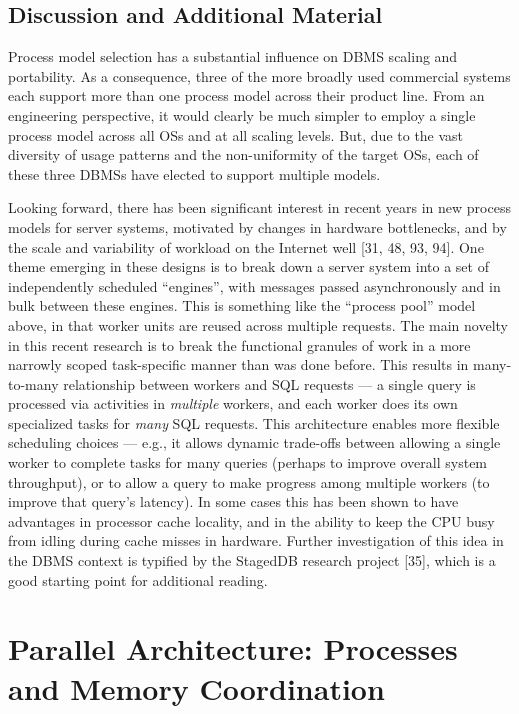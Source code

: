\documentclass[b5paper,11pt,twoside,openright]{book}
\begin{document}
\hypertarget{discussion-and-additional-material}{%
\section{Discussion and Additional
Material}\label{discussion-and-additional-material}}

Process model selection has a substantial influence on DBMS scaling and
portability. As a consequence, three of the more broadly used commercial
systems each support more than one process model across their product
line. From an engineering perspective, it would clearly be much simpler
to employ a single process model across all OSs and at all scaling
levels. But, due to the vast diversity of usage patterns and the
non-uniformity of the target OSs, each of these three DBMSs have elected
to support multiple models.

Looking forward, there has been significant interest in recent years in
new process models for server systems, motivated by changes in hardware
bottlenecks, and by the scale and variability of workload on the
Internet well {[}31, 48, 93, 94{]}. One theme emerging in these designs
is to break down a server system into a set of independently scheduled
``engines'', with messages passed asynchronously and in bulk between
these engines. This is something like the ``process pool'' model above,
in that worker units are reused across multiple requests. The main
novelty in this recent research is to break the functional granules of
work in a more narrowly scoped task-specific manner than was done
before. This results in many-to-many relationship between workers and
SQL requests --- a single query is processed via activities in
\emph{multiple} workers, and each worker does its own specialized tasks
for \emph{many} SQL requests. This architecture enables more flexible
scheduling choices --- e.g., it allows dynamic trade-offs between
allowing a single worker to complete tasks for many queries (perhaps to
improve overall system throughput), or to allow a query to make progress
among multiple workers (to improve that query's latency). In some cases
this has been shown to have advantages in processor cache locality, and
in the ability to keep the CPU busy from idling during cache misses in
hardware. Further investigation of this idea in the DBMS context is
typified by the StagedDB research project {[}35{]}, which is a good
starting point for additional reading.

\hypertarget{parallel-architecture-processes-and-memory-coordination}{%
\chapter{Parallel Architecture: Processes and Memory
Coordination}\label{parallel-architecture-processes-and-memory-coordination}}
\end{document}
